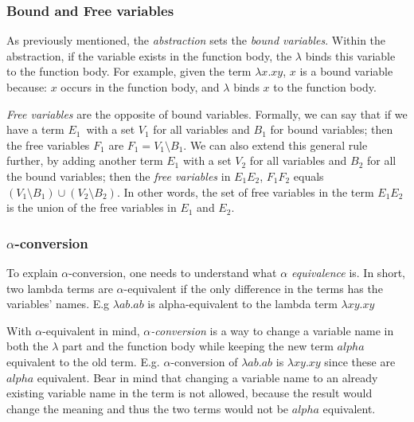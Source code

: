\subsubsection{Bound and Free variables}
As previously mentioned, the \emph{abstraction} sets the \emph{bound variables}. Within the abstraction, if the variable exists in the function body, the $\lambda$ binds this variable to the function body. For example, given the term $\lambda x.xy$, $x$ is a bound variable because: $x$ occurs in the function body, and $\lambda$ binds $x$ to the function body.

\para
\emph{Free variables} are the opposite of bound variables. Formally, we can say that if we have a term $E_1$ with a set $V_1$ for all variables and $B_1$ for bound variables; 
then the free variables $F_1$ are $F_1 = V_1\setminus B_1$. We can also extend this general rule further, 
by adding another term $E_1$ with a set $V_2$ for all variables and $B_2 $ for all the bound variables;
then the \emph{free variables} in $E_1 E_2$, $F_1 F_2$ equals $ (V_1\setminus B_1) \cup (V_2\setminus B_2)$. 
In other words, the set of free variables in the term $E_1 E_2$ is the union of the free variables in $E_1$ and $E_2$.

\subsubsection{$\alpha$-conversion}
To explain $\alpha$-conversion, one needs to understand what \emph{$\alpha$ equivalence} is. In short, two lambda terms are $\alpha$-equivalent if the only difference in the terms has the variables' names. E.g $\lambda ab.ab$ is alpha-equivalent to the lambda term $\lambda xy.xy$ 

\para
With $\alpha$-equivalent in mind, \emph{$\alpha$-conversion} is a way to change a variable name in both the $\lambda$ part and the function body while keeping the new term $alpha$ equivalent to the old term. E.g. $\alpha$-conversion of $\lambda ab.ab$ is $\lambda xy.xy$ since these are $alpha$ equivalent. Bear in mind that changing a variable name to an already existing variable name in the term is not allowed, because the result would change the meaning and thus the two terms would not be $alpha$ equivalent.

